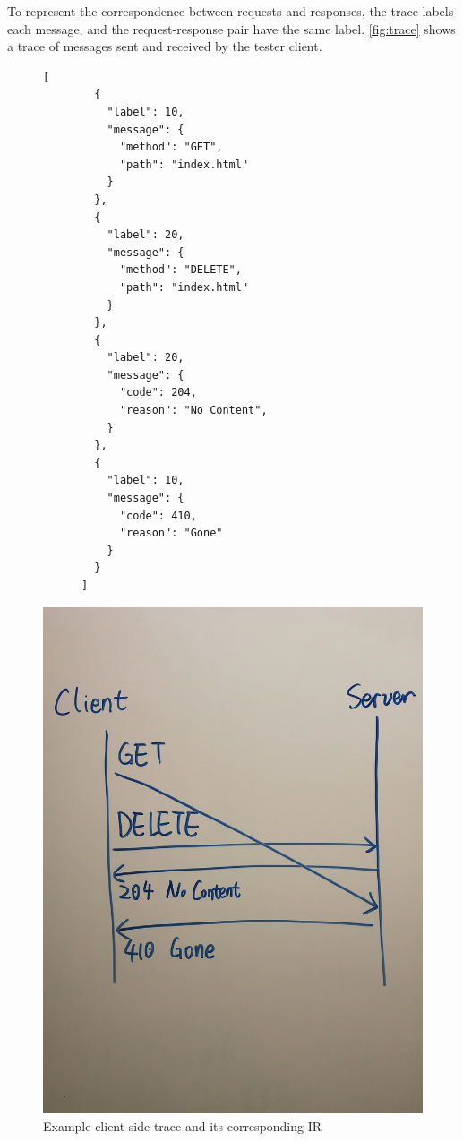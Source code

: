 \documentclass{article}
\theoremstyle{definition}
\begin{document}
To represent the correspondence between requests and responses, the trace labels
each message, and the request-response pair have the same label.
\autoref{fig:trace} shows a trace of messages sent and received by the tester
client.

\begin{figure}
  \begin{minipage}{.5\textwidth}
    \begin{lstlisting}[style=json]
      [
        {
          "label": 10,
          "message": {
            "method": "GET",
            "path": "index.html"
          }
        },
        {
          "label": 20,
          "message": {
            "method": "DELETE",
            "path": "index.html"
          }
        },
        {
          "label": 20,
          "message": {
            "code": 204,
            "reason": "No Content",
          }
        },
        {
          "label": 10,
          "message": {
            "code": 410,
            "reason": "Gone"
          }
        }
      ]
    \end{lstlisting}
  \end{minipage}%
  \begin{minipage}{.5\textwidth}
    \includegraphics[width=\textwidth]{figures/trace}
  \end{minipage}
  \caption{Example client-side trace and its corresponding IR}
  \label{fig:trace}
\end{figure}
\end{document}
